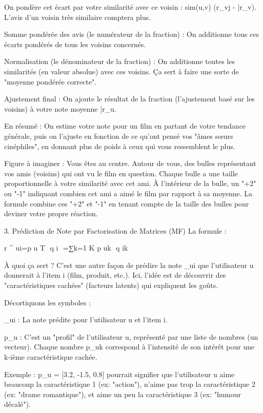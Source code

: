 On pondère cet écart par votre similarité avec ce voisin : sim(u,v) \cdot (r_{vj} - \bar{r}_v). L'avis d'un voisin très similaire comptera plus.

Somme pondérée des avis (le numérateur de la fraction) : On additionne tous ces écarts pondérés de tous les voisins concernés.

Normalisation (le dénominateur de la fraction) : On additionne toutes les similarités (en valeur absolue) avec ces voisins. Ça sert à faire une sorte de "moyenne pondérée correcte".

Ajustement final : On ajoute le résultat de la fraction (l'ajustement basé sur les voisins) à votre note moyenne \bar{r}_u.

En résumé : On estime votre note pour un film en partant de votre tendance générale, puis on l'ajuste en fonction de ce qu'ont pensé vos "âmes sœurs cinéphiles", en donnant plus de poids à ceux qui vous ressemblent le plus.

Figure à imaginer :
Vous êtes au centre. Autour de vous, des bulles représentant vos amis (voisins) qui ont vu le film en question. Chaque bulle a une taille proportionnelle à votre similarité avec cet ami. À l'intérieur de la bulle, un "+2" ou "-1" indiquant combien cet ami a aimé le film par rapport à sa moyenne. La formule combine ces "+2" et "-1" en tenant compte de la taille des bulles pour deviner votre propre réaction.

3. Prédiction de Note par Factorisation de Matrices (MF)
La formule :


r
^
 ui=p 
u
T
​
 q 
i
​
 =∑k=1 
K
 p 
uk
​
 q 
ik
​
 
À quoi ça sert ?
C'est une autre façon de prédire la note _{ui} que l'utilisateur u donnerait à l'item i (film, produit, etc.). Ici, l'idée est de découvrir des "caractéristiques cachées" (facteurs latents) qui expliquent les goûts.

Décortiquons les symboles :

_{ui} : La note prédite pour l'utilisateur u et l'item i.

p_u : C'est un "profil" de l'utilisateur u, représenté par une liste de nombres (un vecteur). Chaque nombre p_{uk} correspond à l'intensité de son intérêt pour une k-ième caractéristique cachée.

Exemple : p_u = [3.2, -1.5, 0.8] pourrait signifier que l'utilisateur u aime beaucoup la caractéristique 1 (ex: "action"), n'aime pas trop la caractéristique 2 (ex: "drame romantique"), et aime un peu la caractéristique 3 (ex: "humour décalé").

